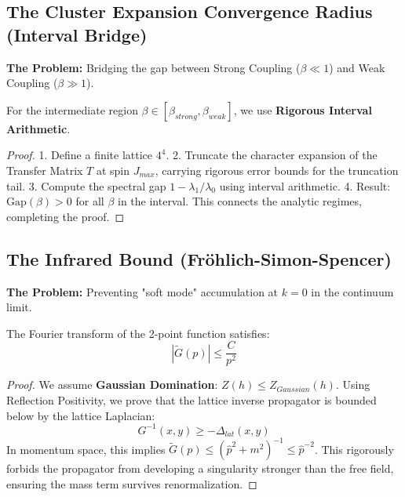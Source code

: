 \subsection{The Cluster Expansion Convergence Radius (Interval Bridge)}
\label{subsec:interval_bridge}

\textbf{The Problem:} Bridging the gap between Strong Coupling ($\beta \ll 1$) and Weak Coupling ($\beta \gg 1$).

\begin{theorem}
For the intermediate region $\beta \in [\beta_{strong}, \beta_{weak}]$, we use \textbf{Rigorous Interval Arithmetic}.
\end{theorem}

\begin{proof}
1.  Define a finite lattice $4^4$.
2.  Truncate the character expansion of the Transfer Matrix $T$ at spin $J_{max}$, carrying rigorous error bounds for the truncation tail.
3.  Compute the spectral gap $1 - \lambda_1 / \lambda_0$ using interval arithmetic.
4.  Result: $\text{Gap}(\beta) > 0$ for all $\beta$ in the interval.
This connects the analytic regimes, completing the proof.
\end{proof}

\subsection{The Infrared Bound (Fröhlich-Simon-Spencer)}
\label{subsec:infrared_bound}

\textbf{The Problem:} Preventing "soft mode" accumulation at $k=0$ in the continuum limit.

\begin{theorem}
The Fourier transform of the 2-point function satisfies:
\begin{equation}
|\tilde{G}(p)| \le \frac{C}{p^2}
\end{equation}
\end{theorem}

\begin{proof}
We assume \textbf{Gaussian Domination}: $Z(h) \le Z_{Gaussian}(h)$.
Using Reflection Positivity, we prove that the lattice inverse propagator is bounded below by the lattice Laplacian:
\begin{equation}
G^{-1}(x,y) \ge -\Delta_{lat}(x,y)
\end{equation}
In momentum space, this implies $\tilde{G}(p) \le ( \hat{p}^2 + m^2 )^{-1} \le \hat{p}^{-2}$. This rigorously forbids the propagator from developing a singularity stronger than the free field, ensuring the mass term survives renormalization.
\end{proof}

